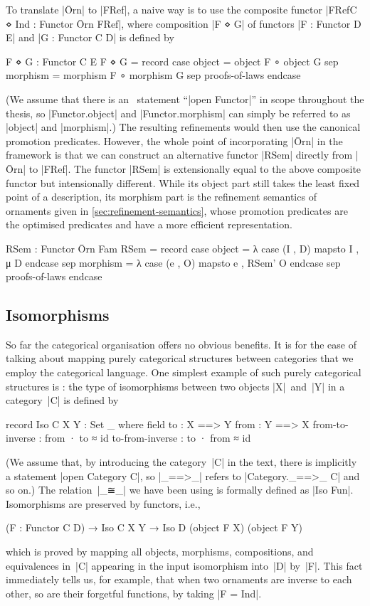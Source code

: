 To translate |Ōrn| to |FRef|, a naive way is to use the composite functor |FRefC ⋄ Ind : Functor Ōrn FRef|, where composition |F ⋄ G| of functors |F : Functor D E| and |G : Functor C D| is defined by
\begin{code}
F ⋄ G : Functor C E
F ⋄ G = record  case  object    = object F ∘ object G
                sep   morphism  = morphism F ∘ morphism G
                sep   proofs-of-laws endcase
\end{code}
(We assume that there is an \Agda\ statement ``|open Functor|'' in scope throughout the thesis, so |Functor.object| and |Functor.morphism| can simply be referred to as |object| and |morphism|.)
The resulting refinements would then use the canonical promotion predicates.
However, the whole point of incorporating |Ōrn| in the framework is that we can construct an alternative functor |RSem| directly from |Ōrn| to |FRef|.
The functor |RSem| is extensionally equal to the above composite functor but intensionally different.
While its object part still takes the least fixed point of a description, its morphism part is the refinement semantics of ornaments given in \autoref{sec:refinement-semantics}, whose promotion predicates are the optimised predicates and have a more efficient representation.
\begin{code}
RSem : Functor Ōrn Fam
RSem = record  case  object    =  λ case (I , D) mapsto I , μ D      endcase
               sep   morphism  =  λ case (e , O) mapsto e , RSem' O  endcase
               sep   proofs-of-laws endcase
\end{code}

\subsection{Isomorphisms}
\label{sec:isomorphisms}

So far the categorical organisation offers no obvious benefits.
It is for the ease of talking about mapping purely categorical structures between categories that we employ the categorical language.
One simplest example of such purely categorical structures is : the type of isomorphisms between two objects |X|~and~|Y| in a category~|C| is defined by
\begin{code}
record Iso C X Y : Set _ where
  field
    to    : X ==> Y
    from  : Y ==> X
    from-to-inverse  : from · to ≈ id
    to-from-inverse  : to · from ≈ id
\end{code}
(We assume that, by introducing the category~|C| in the text, there is implicitly a statement |open Category C|, so |_==>_| refers to |Category._==>_ C| and so on.)
The relation~|_≅_| we have been using is formally defined as |Iso Fun|.
Isomorphisms are preserved by functors, i.e.,
\begin{code}
(F : Functor C D) → Iso C X Y → Iso D (object F X) (object F Y)
\end{code}
which is proved by mapping all objects, morphisms, compositions, and equivalences in~|C| appearing in the input isomorphism into~|D| by~|F|.
This fact immediately tells us, for example, that when two ornaments are inverse to each other, so are their forgetful functions, by taking |F = Ind|.

